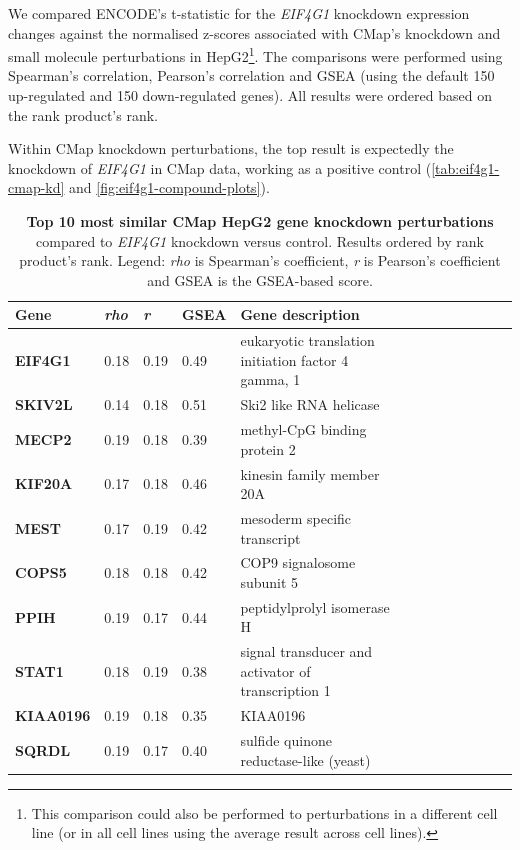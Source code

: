 We compared ENCODE's t-statistic for the \emph{EIF4G1} knockdown expression changes against the normalised z-scores associated with CMap's knockdown and small molecule perturbations in HepG2\footnote{This comparison could also be performed to perturbations in a different cell line (or in all cell lines using the average result across cell lines).}. The comparisons were performed using Spearman's correlation, Pearson's correlation and GSEA (using the default 150 up-regulated and 150 down-regulated genes). All results were ordered based on the rank product's rank.

Within CMap knockdown perturbations, the top result is expectedly the knockdown of \emph{EIF4G1} in CMap data, working as a positive control (\autoref{tab:eif4g1-cmap-kd} and \autoref{fig:eif4g1-compound-plots}).

\begin{table}[!h]
\centering
\footnotesize
\caption[Top 10 CMap HepG2 gene knockdown perturbations]{\textbf{Top 10 most similar CMap HepG2 gene knockdown perturbations} compared to \emph{EIF4G1} knockdown versus control. Results ordered by rank product's rank. Legend: \emph{rho} is Spearman's coefficient, \emph{r} is Pearson's coefficient and GSEA is the GSEA-based score.}
\label{tab:eif4g1-cmap-kd}
\begin{tabular}{lllllllllllll}
\toprule
\textbf{Gene}     & \textbf{\emph{rho}} & \textbf{\emph{r}} & \textbf{GSEA} & \textbf{Gene description}                           \\
\midrule
\textbf{EIF4G1}   & 0.18         & 0.19       & 0.49          & eukaryotic translation initiation factor 4 gamma, 1 \\
\textbf{SKIV2L}   & 0.14         & 0.18       & 0.51          & Ski2 like RNA helicase                              \\
\textbf{MECP2}    & 0.19         & 0.18       & 0.39          & methyl-CpG binding protein 2                        \\
\textbf{KIF20A}   & 0.17         & 0.18       & 0.46          & kinesin family member 20A                           \\
\textbf{MEST}     & 0.17         & 0.19       & 0.42          & mesoderm specific transcript                        \\
\textbf{COPS5}    & 0.18         & 0.18       & 0.42          & COP9 signalosome subunit 5                          \\
\textbf{PPIH}     & 0.19         & 0.17       & 0.44          & peptidylprolyl isomerase H                          \\
\textbf{STAT1}    & 0.18         & 0.19       & 0.38          & signal transducer and activator of transcription 1  \\
\textbf{KIAA0196} & 0.19         & 0.18       & 0.35          & KIAA0196                                            \\
\textbf{SQRDL}    & 0.19         & 0.17       & 0.40          & sulfide quinone reductase-like (yeast)             \\
\bottomrule
\end{tabular}
\end{table}

